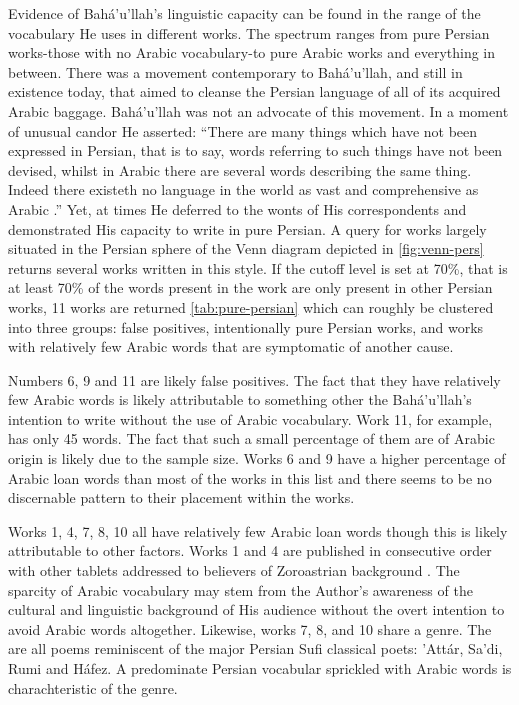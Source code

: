 \documentclass[12pt, oneside]{report}
\begin{document}
\par
Evidence of Bah\'{a}'u'llah's linguistic capacity can be found in the range of the vocabulary He uses in different works. The spectrum ranges from pure Persian works-those with no Arabic vocabulary-to pure Arabic works and everything in between. There was a movement contemporary to Bah\'{a}'u'llah, and still in existence today, that aimed to cleanse the Persian language of all of its acquired Arabic baggage. Bah\'{a}'u'llah was not an advocate of this movement. In a moment of unusual candor He asserted: ``There are many things which have not been expressed in Persian, that is to say, words referring to such things have not been devised, whilst in Arabic there are several words describing the same thing. Indeed there existeth no language in the world as vast and comprehensive as Arabic \cite{bahaullah_tabernacle_2006}.'' Yet, at times He deferred to the wonts of His correspondents and demonstrated His capacity to write in pure Persian. A query for works largely situated in the Persian sphere of the Venn diagram depicted in \autoref{fig:venn-pers} returns several works written in this style. If the cutoff level is set at 70\%, that is at least 70\% of the words present in the work are only present in other Persian works, 11 works are returned \ref{tab:pure-persian} which can roughly be clustered into three groups: false positives, intentionally pure Persian works, and works with relatively few Arabic words that are symptomatic of another cause.
\par
Numbers 6, 9 and 11 are likely false positives. The fact that they have relatively few Arabic words is likely attributable to something other the Bah\'{a}'u'llah's intention to write without the use of Arabic vocabulary. Work 11, for example, has only 45 words. The fact that such a small percentage of them are of Arabic origin is likely due to the sample size. Works 6 and 9 have a higher percentage of Arabic loan words than most of the works in this list and there seems to be no discernable pattern to their placement within the works. 
\par
Works 1, 4, 7, 8, 10 all have relatively few Arabic loan words though this is likely attributable to other factors. Works 1 and 4 are published in consecutive order with other tablets addressed to believers of Zoroastrian background \cite{bahaullah_majmu`ih-i_1920}. The sparcity of Arabic vocabulary may stem from the Author's awareness of the cultural and linguistic background of His audience without the overt intention to avoid Arabic words altogether. Likewise, works 7, 8, and 10 share a genre. The are all poems reminiscent of the major Persian Sufi classical poets: 'Att\'{a}r, Sa'di, Rumi and H\'{a}fez. A predominate Persian vocabular sprickled with Arabic words is charachteristic of the genre.
\end{document}
